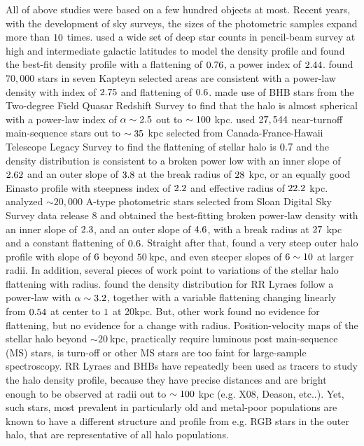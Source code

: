 \documentclass[12pt,preprint]{aastex}
\begin{document}
All of above studies were based on a few hundred objects at most. Recent years, with the development of sky surveys, the sizes of the photometric samples expand more than $\rm 10$ times. \citet{Robin2000} used a wide set of deep star counts in pencil-beam survey at high and intermediate galactic latitudes to model the density profile and found the best-fit density profile with a flattening of $\rm 0.76$, a power index of $\rm 2.44$. \citet{Siegel2002} found $70,000$ stars in seven Kapteyn selected areas are consistent with a power-law density with index of $\rm 2.75$ and flattening of $\rm 0.6$. \citet{Propris2010} made use of BHB stars from the Two-degree Field Quasar Redshift Survey to find that the halo is almost spherical with a power-law index of $\rm \alpha \sim 2.5$ out to $\rm \sim 100~$kpc. \citet{Sesar2011} used $\rm 27,544$ near-turnoff main-sequence stars out to $\rm \sim 35~$kpc selected from Canada-France-Hawaii Telescope Legacy Survey to find the flattening of stellar halo is $\rm 0.7$ and the density distribution is consistent to a broken power low with an inner slope of $\rm 2.62$ and an outer slope of $\rm 3.8$ at the break radius of $\rm 28~$kpc, or an equally good Einasto profile\citep{Einasto1989} with steepness index of $\rm 2.2$ and effective radius of $\rm 22.2~$kpc. \citet{Deason2011} analyzed $\sim 20,000$ A-type photometric stars selected from Sloan Digital Sky Survey data release 8\citep{Ahn2012} and obtained the best-fitting broken power-law density with an inner slope of $\rm 2.3$, and an outer slope of $\rm 4.6$, with a break radius at $\rm 27~$kpc and a constant flattening of $\rm 0.6$. Straight after that, \citet{Deason2014} found a very steep outer halo profile with slope of $\rm 6$ beyond $50~$kpc, and even steeper slopes of $\rm 6\sim10$ at larger radii.
In addition, several pieces of work point to variations of the stellar halo flattening with radius. \citet{Preston1991} found the density distribution for RR Lyraes follow a power-law with $\rm \alpha \sim 3.2$, together with a variable flattening changing linearly from $\rm 0.54$ at center to $\rm 1$ at 20kpc. But, other work \citep{Sluis1998, Sesar2011,Deason2011} found no evidence for flattening, but no evidence for a change with radius.
Position-velocity maps of the stellar halo beyond $\sim 20~$kpc, practically require luminous
post main-sequence (MS) stars, is turn-off or other MS stars are too faint for large-sample spectroscopy. RR Lyraes and BHBs have repeatedly been used as tracers to study the halo density profile, because they have precise distances and are bright enough to be observed at radii out to $\rm \sim 100~$kpc (e.g. X08, Deason, etc..). Yet, such stars, most prevalent in particularly old and metal-poor populations\citep{Bell2008, Xue2011} are known to have a different structure and profile from e.g. RGB stars in the outer halo, that are representative of all halo populations.
\end{document}
